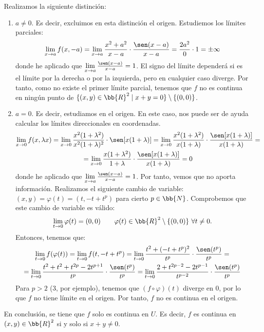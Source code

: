 \begin{ejercicio}
    Realizamos la siguiente distinción:
    \begin{enumerate}
        \item $a\neq 0$. Es decir, excluimos en esta distinción el origen. Estudiemos los límites parciales:
        \begin{equation*}
            \lim_{x\to a}f(x,-a)
            = \lim_{x\to a} \frac{x^2+a^2}{x-a}\cdot \frac{\sen(x-a)}{x-a} = \frac{2a^2}{0}\cdot 1 = \pm \infty
        \end{equation*}
        donde he aplicado que $\lim\limits _{x\to a}\frac{\sen(x-a)}{x-a}=1$. El signo del límite dependerá si es el límite por la derecha o por la izquierda, pero en cualquier caso diverge. Por tanto, como no existe el primer límite parcial, tenemos que $f$ no es continua en ningún punto de $\{(x,y)\in \bb{R}^2\mid x+y=0\}\setminus \{(0,0)\}$.

        \item $a=0$. Es decir, estudiamos en el origen. En este caso, nos puede ser de ayuda calcular los límites direccionales en coordenadas.
        \begin{multline*}
            \lim_{x\to 0}f(x,\lambda x)
            = \lim_{x\to 0} \frac{x^2(1+\lambda^2)}{x^2(1+\lambda)^2}\cdot \sen[x(1+\lambda)]
            = \lim_{x\to 0} \frac{x^2(1+\lambda^2)}{x(1+\lambda)}\cdot \frac{\sen[x(1+\lambda)]}{x(1+\lambda)}
            =\\= \lim_{x\to 0} \frac{x(1+\lambda^2)}{1+\lambda}\cdot \frac{\sen[x(1+\lambda)]}{x(1+\lambda)} = 0
        \end{multline*}
        donde he aplicado que $\lim\limits _{x\to a}\frac{\sen(x-a)}{x-a}=1$. Por tanto, vemos que no aporta información. Realizamos el siguiente cambio de variable: $(x,y)=\varphi(t)=(t,-t+t^p)$ para cierto $p\in \bb{N}$. Comprobemos que este cambio de variable es válido:
        \begin{equation*}
            \lim_{t\to 0}\varphi(t)=(0,0) \qquad \varphi(t)\in \bb{R}^2\setminus\{(0,0)\}~\forall t\neq 0.
        \end{equation*}
        Entonces, tenemos que:
        \begin{multline*}
            \lim_{t\to 0}f(\varphi(t))
            = \lim_{t\to 0}f(t,-t+t^p)
            = \lim_{t\to 0}\frac{t^2+(-t+t^p)^2}{t^p}\cdot \frac{\sen(t^p)}{t^p}
            =\\= \lim_{t\to 0}\frac{t^2+t^2+t^{2p}-2t^{p+1}}{t^p}\cdot \frac{\sen(t^p)}{t^p}
            = \lim_{t\to 0}\frac{2+t^{2p-2}-2t^{p-1}}{t^{p-2}}\cdot \frac{\sen(t^p)}{t^p}
        \end{multline*}
        Para $p>2$ (3, por ejemplo), tenemos que $(f\circ \varphi)(t)$ diverge en 0, por lo que $f$ no tiene límite en el origen. Por tanto, $f$ no es continua en el origen.  
    \end{enumerate}

    En conclusión, se tiene que $f$ solo es continua en $U$. Es decir, $f$ es continua en $(x,y)\in \bb{R}^2$ si y solo si $x+y\neq 0$.
\end{ejercicio}

